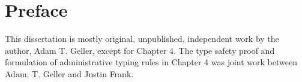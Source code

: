 \chapter{Preface}
This dissertation is mostly original, unpublished, independent work by the author, Adam T. Geller, except for Chapter 4.
The type safety proof and formulation of administrative typing rules in Chapter 4 was joint work between Adam. T. Geller and Justin Frank.